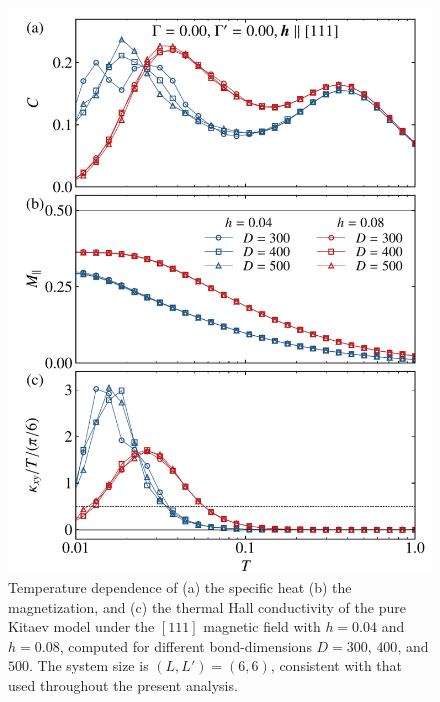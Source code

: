 \documentclass[twocolumn,superscriptaddress,showpacs, longbibliography, aps, prx]{revtex4-2}
\begin{document}
\begin{figure}[t]
  \begin{center}
    \includegraphics[width=\linewidth]{Data_for_figs/plot/fig-18-XTRG-Ddep66.pdf}
  \end{center}
  \caption{Temperature dependence of (a) the specific heat (b) the magnetization, and (c) the thermal Hall conductivity of the pure Kitaev model under the $[111]$ magnetic field with $h=0.04$ and $h=0.08$, computed for different bond-dimensions $D=300$, $400$, and $500$. The system size is $(L, L') = (6, 6)$, consistent with that used throughout the present analysis.
}
  \label{fig:CMk_XC6}
\end{figure}
\end{document}
